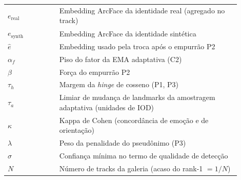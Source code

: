 

\begin{listasimb}

\begin{longtable}[l]{p{0.2\linewidth}p{0.7\linewidth}}
$e_{\mathrm{real}}$ & Embedding ArcFace da identidade real (agregado no track)\\
$e_{\mathrm{synth}}$ & Embedding ArcFace da identidade sintética\\
$\hat{e}$ & Embedding usado pela troca após o empurrão P2\\
$\alpha_f$ & Piso do fator da EMA adaptativa (C2)\\
$\beta$ & Força do empurrão P2\\
$\tau_h$ & Margem da \emph{hinge} de cosseno (P1, P3)\\
$\tau_a$ & Limiar de mudança de landmarks da amostragem adaptativa (unidades de IOD)\\
$\kappa$ & Kappa de Cohen (concordância de emoção e de orientação)\\
$\lambda$ & Peso da penalidade do pseudônimo (P3)\\
$\sigma$ & Confiança mínima no termo de qualidade de detecção\\
$N$ & Número de tracks da galeria (acaso do rank-1 $= 1/N$)\\
\end{longtable}

\end{listasimb}

